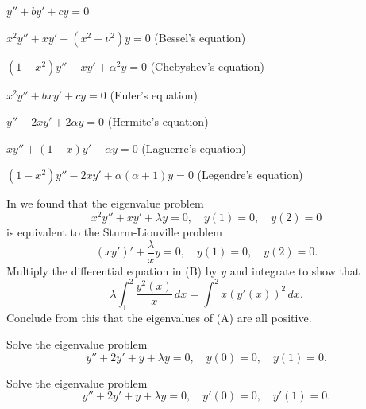 \begin{exerciselist}

\item\label{exer:13.2.1}$y''+by'+cy=0$

\item\label{exer:13.2.2}$x^{2}y''+xy'+(x^{2}-\nu^{2})y=0$ \quad (Bessel's
equation)

\item\label{exer:13.2.3}$(1-x^{2})y''-xy'+\alpha^{2}y=0$ \quad
(Chebyshev's equation)

\item\label{exer:13.2.4}$x^{2}y''+bxy'+cy=0$ \quad (Euler's equation)

\item\label{exer:13.2.5}$y''-2xy'+2\alpha y=0$ \quad (Hermite's equation)
\item\label{exer:13.2.6}$xy''+(1-x)y'+\alpha y=0$ \quad (Laguerre's equation)

\item\label{exer:13.2.7}$(1-x^{2})y''-2xy'+\alpha(\alpha+1)y=0$
\quad (Legendre's equation)

\item\label{exer:13.2.8}In  we found that the eigenvalue problem
\[
x^{2}y''+xy'+\lambda y=0,\quad y(1)=0,\quad y(2)=0 \tag{A}
\]
is equivalent to the Sturm-Liouville problem
\[\tag{B}
(xy')'+\frac{\lambda}{x}y=0,\quad y(1)=0,\quad y(2)=0.
\]
Multiply the differential equation in (B) by $y$ and integrate to show that
\[
\lambda\int_{1}^{2}\frac{y^{2}(x)}{x}\,dx=\int_{1}^{2}x(y'(x))^{2}\,dx.
\]
Conclude from this that the eigenvalues of (A) are all positive.

\item\label{exer:13.2.9}Solve the eigenvalue problem
\[
y''+2y'+y+\lambda y=0,\quad y(0)=0, \quad y(1)=0.
\]


\item\label{exer:13.2.10}Solve the eigenvalue problem
\[
y''+2y'+y+\lambda y=0,\quad y'(0)=0, \quad y'(1)=0.
\]



\end{exerciselist}
